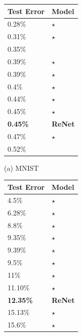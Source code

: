 \begin{table}[ht]
    \centering

    \begin{minipage}{0.45\textwidth}
        \centering

        \begin{tabular}{l |  l}
            Test Error & Model  \\
            \hline
0.28\% & \citep{DBLP:conf/icml/WanZZLF13}$\star$ \\
0.31\% & \citep{DBLP:journals/corr/Graham14}$\star$ \\
0.35\% & \citep{DBLP:journals/corr/abs-1003-0358} \\
0.39\% & \citep{DBLP:conf/nips/MairalKHS14}$\star$ \\
0.39\% & \citep{DBLP:journals/corr/LeeXGZT14}$\star$ \\
0.4\% & \citep{DBLP:conf/icdar/SimardSP03}$\star$ \\
0.44\% & \citep{DBLP:journals/corr/Graham14a}$\star$ \\
0.45\% & \citep{Goodfellow2013}$\star$ \\
\bf{0.45\%} & \bf{ReNet} \\
0.47\% & \citep{Lin2014}$\star$ \\
0.52\% & \citep{DBLP:journals/pami/AzzopardiA13} \\
        \end{tabular}

        \vspace{2mm}
        (a) MNIST
    \end{minipage}
    \hfill
    \begin{minipage}{0.45\textwidth}
        \centering

        \begin{tabular}{l |  l}
            Test Error & Model  \\
            \hline
4.5\% & \citep{DBLP:journals/corr/Graham14a}$\star$ \\
6.28\% & \citep{DBLP:journals/corr/Graham14}$\star$ \\
8.8\% & \citep{Lin2014}$\star$ \\
9.35\% & \citep{Goodfellow2013}$\star$ \\
9.39\% & \citep{DBLP:journals/corr/SpringenbergR13}$\star$ \\
9.5\% & \citep{DBLP:conf/nips/SnoekLA12}$\star$ \\
11\% & \citep{Krizhevsky-2012}$\star$ \\
11.10\% & \citep{DBLP:conf/icml/WanZZLF13}$\star$ \\
\bf{12.35\%} & \bf{ReNet} \\
15.13\% & \citep{DBLP:journals/corr/abs-1301-3557}$\star$ \\
15.6\% & \citep{DBLP:journals/corr/abs-1207-0580}$\star$ \\
        \end{tabular}


\end{minipage}
\end{table}
